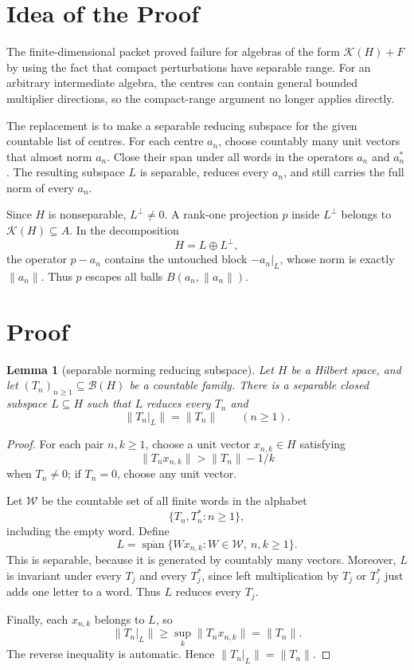 \documentclass[11pt]{article}
\newtheorem{lemma}{Lemma}
\newcommand{\Kcal}{\mathcal K}
\newcommand{\Bcal}{\mathcal B}
\begin{document}
\section*{Idea of the Proof}

The finite-dimensional packet proved failure for algebras of the form
\(\Kcal(H)+F\) by using the fact that compact perturbations have separable
range.  For an arbitrary intermediate algebra, the centres can contain
general bounded multiplier directions, so the compact-range argument no
longer applies directly.

The replacement is to make a separable reducing subspace for the given
countable list of centres.  For each centre \(a_n\), choose countably many
unit vectors that almost norm \(a_n\).  Close their span under all words in
the operators \(a_n\) and \(a_n^*\).  The resulting subspace \(L\) is
separable, reduces every \(a_n\), and still carries the full norm of every
\(a_n\).

Since \(H\) is nonseparable, \(L^\perp\ne0\).  A rank-one projection \(p\)
inside \(L^\perp\) belongs to \(\Kcal(H)\subseteq A\).  In the decomposition
\[
        H=L\oplus L^\perp,
\]
the operator \(p-a_n\) contains the untouched block \(-a_n|_L\), whose norm
is exactly \(\|a_n\|\).  Thus \(p\) escapes all balls
\(B(a_n,\|a_n\|)\).

\section*{Proof}

\begin{lemma}[separable norming reducing subspace]
\label{lem:reducing}
Let \(H\) be a Hilbert space, and let \((T_n)_{n\ge1}\subseteq\Bcal(H)\) be a
countable family.  There is a separable closed subspace \(L\subseteq H\) such
that \(L\) reduces every \(T_n\) and
\[
        \|T_n|_L\|=\|T_n\|
        \qquad(n\ge1).
\]
\end{lemma}

\begin{proof}
For each pair \(n,k\ge1\), choose a unit vector \(x_{n,k}\in H\) satisfying
\[
        \|T_nx_{n,k}\|>\|T_n\|-1/k
\]
when \(T_n\ne0\); if \(T_n=0\), choose any unit vector.

Let \(\mathcal W\) be the countable set of all finite words in the alphabet
\[
        \{T_n,T_n^*:n\ge1\},
\]
including the empty word.  Define
\[
        L=
        \overline{\operatorname{span}}
        \{W x_{n,k}: W\in\mathcal W,\ n,k\ge1\}.
\]
This is separable, because it is generated by countably many vectors.
Moreover, \(L\) is invariant under every \(T_j\) and every \(T_j^*\), since
left multiplication by \(T_j\) or \(T_j^*\) just adds one letter to a word.
Thus \(L\) reduces every \(T_j\).

Finally, each \(x_{n,k}\) belongs to \(L\), so
\[
        \|T_n|_L\|\ge \sup_k \|T_nx_{n,k}\|=\|T_n\|.
\]
The reverse inequality is automatic.  Hence \(\|T_n|_L\|=\|T_n\|\).
\end{proof}
\end{document}
